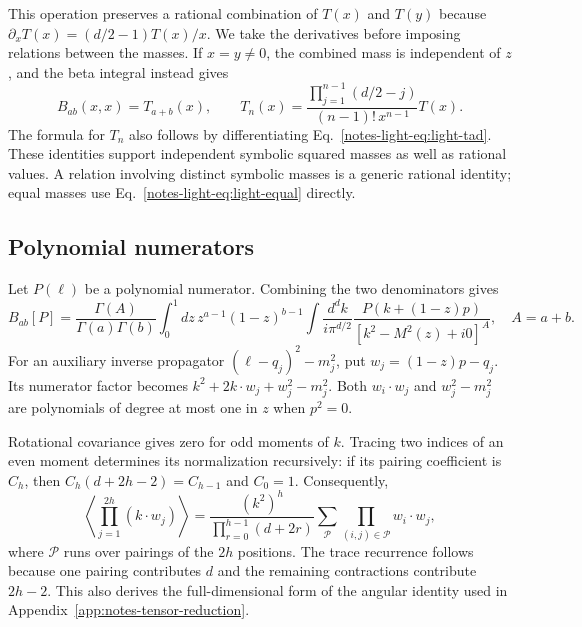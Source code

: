 \documentclass[11pt,a4paper]{article}
\begin{document}
This operation preserves a rational combination of $T(x)$ and $T(y)$ because $\partial_xT(x)=(d/2-1)T(x)/x$. We take the derivatives before imposing relations between the masses. If $x=y\ne0$, the combined mass is independent of $z$, and the beta integral instead gives
\begin{equation}
 B_{ab}(x,x)=T_{a+b}(x),\qquad
 T_n(x)=\frac{\prod_{j=1}^{n-1}(d/2-j)}{(n-1)!\,x^{n-1}}T(x).
 \label{notes-light-eq:light-equal}
\end{equation}
The formula for $T_n$ also follows by differentiating Eq.~\eqref{notes-light-eq:light-tad}. These identities support independent symbolic squared masses as well as rational values. A relation involving distinct symbolic masses is a generic rational identity; equal masses use Eq.~\eqref{notes-light-eq:light-equal} directly.

\subsection{Polynomial numerators}
Let $P(\ell)$ be a polynomial numerator. Combining the two denominators gives
\begin{equation}
 B_{ab}[P]=\frac{\Gamma(A)}{\Gamma(a)\Gamma(b)}\int_0^1 dz\,
 z^{a-1}(1-z)^{b-1}\int\frac{d^dk}{i\pi^{d/2}}
 \frac{P(k+(1-z)p)}{[k^2-M^2(z)+i0]^A},\quad A=a+b.
 \label{notes-light-eq:light-parameter}
\end{equation}
For an auxiliary inverse propagator $(\ell-q_j)^2-m_j^2$, put $w_j=(1-z)p-q_j$. Its numerator factor becomes $k^2+2k\cdot w_j+w_j^2-m_j^2$. Both $w_i\cdot w_j$ and $w_j^2-m_j^2$ are polynomials of degree at most one in $z$ when $p^2=0$.

Rotational covariance gives zero for odd moments of $k$. Tracing two indices of an even moment determines its normalization recursively: if its pairing coefficient is $C_h$, then $C_h(d+2h-2)=C_{h-1}$ and $C_0=1$. Consequently,
\begin{equation}
 \left\langle\prod_{j=1}^{2h}(k\cdot w_j)\right\rangle
 =\frac{(k^2)^h}{\prod_{r=0}^{h-1}(d+2r)}
 \sum_{\mathcal P}\prod_{(i,j)\in\mathcal P}w_i\cdot w_j,
 \label{notes-light-eq:light-angular}
\end{equation}
where $\mathcal P$ runs over pairings of the $2h$ positions. The trace recurrence follows because one pairing contributes $d$ and the remaining contractions contribute $2h-2$. This also derives the full-dimensional form of the angular identity used in Appendix~\ref{app:notes-tensor-reduction}.
\end{document}

